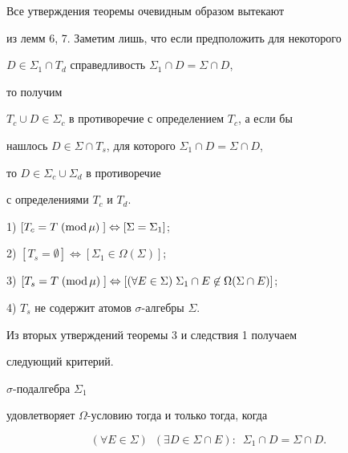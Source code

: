 \begin{pf} Все утверждения теоремы очевидным образом вытекают


из лемм 6, 7. Заметим лишь, что если предположить для некоторого


$D\in\Sigma_1\cap T_d$ справедливость $\Sigma_1\cap D=\Sigma\cap D$,


то получим


$T_c\cup D\in\Sigma_c$ в противоречие с определением $T_c$, а если бы


нашлось $D\in\Sigma\cap T_s$, для которого $\Sigma_1\cap D=\Sigma\cap D$,


то $D\in\Sigma_c\cup\Sigma_d$ в противоречие


с определениями $T_c$ и $T_d$.


\end{pf}





\begin{cor}


1) $[T_c=T\;(\mathrm{mod}\,\mu)\;]\Leftrightarrow[\Sigma=\Sigma_1]$;





2) $[T_s=\emptyset]\Leftrightarrow[\Sigma_1\in{\Omega}(\Sigma)]$;





3) $[T_s=T\moddd]\Leftrightarrow[(\forall E\in\Sigma)\;


\Sigma_1\cap E\not\in{\Omega}(\Sigma\cap E)]$;





4) $T_s$ не содержит атомов $\sigma$-алгебры $\Sigma$.


\end{cor}





Из вторых утверждений теоремы 3 и следствия 1 получаем


следующий критерий.





\begin{cor}


$\sigma$-подалгебра $\Sigma_1$


удовлетворяет $\Omega$-ус\-ло\-вию тогда и только тогда, когда


$$


(\forall E\in\Sigma)\;\ (\exists D\in\Sigma\cap E):\;\


\Sigma_1\cap D=\Sigma\cap D.


$$


\end{cor}





